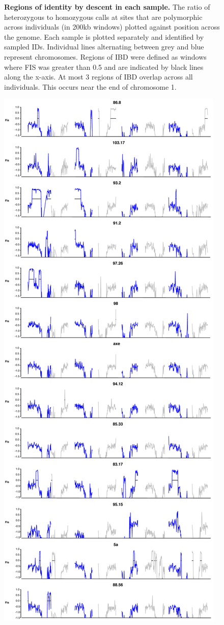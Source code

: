 \begin{figure}[h!]
    \caption{\textbf{Regions of identity by descent in each sample.} The ratio of heterozygous to homozygous calls at sites that are polymorphic across individuals (in 200kb windows) plotted against position across the genome. Each sample is plotted separately and identified by sampled IDs. Individual lines alternating between grey and blue represent chromosomes. Regions of IBD were defined as windows where FIS was greater than 0.5 and are indicated by black lines along the x-axis. At most 3 regions of IBD overlap across all individuals. This occurs near the end of chromosome 1.}
    \label{fig:figS4}
\end{figure}

\begin{figure}[h!]
      \centering
       \includegraphics[scale=0.1]{Ch2FigS5}

\end{figure}
